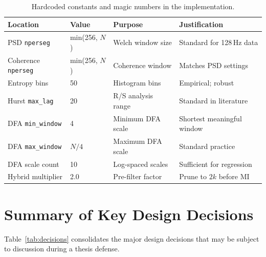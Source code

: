 \begin{table}[h]
\centering
\caption{Hardcoded constants and magic numbers in the implementation.}
\label{tab:constants}
\begin{tabular}{l l l l}
\toprule
\textbf{Location} & \textbf{Value} & \textbf{Purpose} & \textbf{Justification} \\
\midrule
PSD \texttt{nperseg}        & min(256, $N$) & Welch window size   & Standard for 128\,Hz data \\
Coherence \texttt{nperseg}  & min(256, $N$) & Coherence window     & Matches PSD settings \\
Entropy bins                & 50            & Histogram bins       & Empirical; robust \\
Hurst \texttt{max\_lag}     & 20            & R/S analysis range   & Standard in literature \\
DFA \texttt{min\_window}    & 4             & Minimum DFA scale    & Shortest meaningful window \\
DFA \texttt{max\_window}    & $N/4$         & Maximum DFA scale    & Standard practice \\
DFA scale count             & 10            & Log-spaced scales    & Sufficient for regression \\
Hybrid multiplier           & 2.0           & Pre-filter factor    & Prune to $2k$ before MI \\
\bottomrule
\end{tabular}
\end{table}

\section{Summary of Key Design Decisions}
\label{sec:app_decisions_summary}

Table~\ref{tab:decisions} consolidates the major design decisions that may be subject to discussion during a thesis defense.

